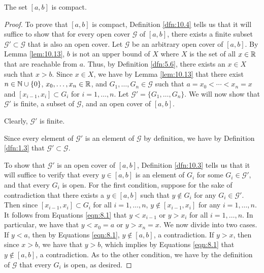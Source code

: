 \documentclass[../main.tex]{subfiles}
\begin{document}
\begin{theorem}\label{trm:10.14}
    The set $[a,b]$ is compact.
    \begin{proof}
        To prove that $[a,b]$ is compact, Definition \ref{dfn:10.4} tells us that it will suffice to show that for every open cover $\mathcal{G}$ of $[a,b]$, there exists a finite subset $\mathcal{G}'\subset\mathcal{G}$ that is also an open cover. Let $\mathcal{G}$ be an arbitrary open cover of $[a,b]$. By Lemma \ref{lem:10.13}, $b$ is not an upper bound of $X$ where $X$ is the set of all $x\in\mathbb{R}$ that are reachable from $a$. Thus, by Definition \ref{dfn:5.6}, there exists an $x\in X$ such that $x>b$. Since $x\in X$, we have by Lemma \ref{lem:10.13} that there exist $n\in\mathbb{N}\cup\{0\}$, $x_0,\dots,x_n\in\mathbb{R}$, and $G_1,\dots,G_n\in\mathcal{G}$ such that $a=x_0<\cdots<x_n=x$ and $[x_{i-1},x_i]\subset G_i$ for $i=1,\dots,n$. Let $\mathcal{G}'=\{G_1,\dots,G_n\}$. We will now show that $\mathcal{G}'$ is finite, a subset of $\mathcal{G}$, and an open cover of $[a,b]$.\par
        Clearly, $\mathcal{G}'$ is finite.\par
        Since every element of $\mathcal{G}'$ is an element of $\mathcal{G}$ by definition, we have by Definition \ref{dfn:1.3} that $\mathcal{G}'\subset\mathcal{G}$.\par
        To show that $\mathcal{G}'$ is an open cover of $[a,b]$, Definition \ref{dfn:10.3} tells us that it will suffice to verify that every $y\in[a,b]$ is an element of $G_i$ for some $G_i\in\mathcal{G}'$, and that every $G_i$ is open. For the first condition, suppose for the  sake of contradiction that there exists a $y\in[a,b]$ such that $y\notin G_i$ for any $G_i\in\mathcal{G}'$. Then since $[x_{i-1},x_i]\subset G_i$ for all $i=1,\dots,n$, $y\notin[x_{i-1},x_i]$ for any $i=1,\dots,n$. It follows from Equations \ref{eqn:8.1} that $y<x_{i-1}$ or $y>x_i$ for all $i=1,\dots,n$. In particular, we have that $y<x_0=a$ or $y>x_n=x$. We now divide into two cases. If $y<a$, then by Equations \ref{eqn:8.1}, $y\notin[a,b]$, a contradiction. If $y>x$, then since $x>b$, we have that $y>b$, which implies by Equations \ref{eqn:8.1} that $y\notin[a,b]$, a contradiction. As to the other condition, we have by the definition of $\mathcal{G}$ that every $G_i$ is open, as desired.
    \end{proof}
\end{theorem}
\end{document}
